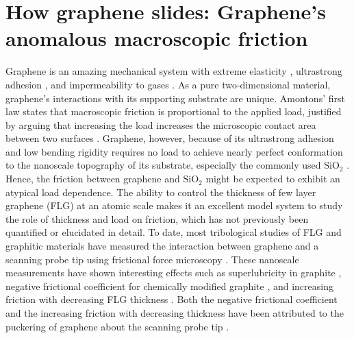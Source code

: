 \chapter{How graphene slides: Graphene's anomalous macroscopic friction \label{chap:fri}}
Graphene is an amazing mechanical system with extreme elasticity \cite{Lee2008}, ultrastrong adhesion \cite{Koenig2011}, and impermeability to gases \cite{Bunch2008}.
As a pure two-dimensional material, graphene's interactions with its supporting substrate are unique.
Amontons' first law states that macroscopic friction is proportional to the applied load, justified by arguing that increasing the load increases the microscopic contact area between two surfaces \cite{Krim1996}.
Graphene, however, because of its ultrastrong adhesion \cite{Koenig2011} and low bending rigidity requires no load to achieve nearly perfect conformation to the nanoscale topography of its substrate, especially the commonly used $\mathrm{SiO_2}$ \cite{Stolyarova2007,Lui2009,Cullen2010}.
Hence, the friction between graphene and $\mathrm{SiO_2}$ might be expected to exhibit an atypical load dependence.
The ability to control the thickness of few layer graphene (FLG) at an atomic scale makes it an excellent model system to study the role of thickness and load on friction, which has not previously been quantified or elucidated in detail.
To date, most tribological studies of FLG and graphitic materials have measured the interaction between graphene and a scanning probe tip using frictional force microscopy \cite{Dienwiebel2004,Deng2012,Lee2010,Li2010c,Filleter2009,Filleter2010,Zhang2012a}.
These nanoscale measurements have shown interesting effects such as superlubricity in graphite \cite{Dienwiebel2004}, negative frictional coefficient for chemically modified graphite \cite{Deng2012}, and increasing friction with decreasing FLG thickness \cite{Lee2010,Li2010c,Filleter2009,Filleter2010}.
Both the negative frictional coefficient and the increasing friction with decreasing thickness have been attributed to the puckering of graphene about the scanning probe tip \cite{Lee2010,Li2010c,Deng2012}.


